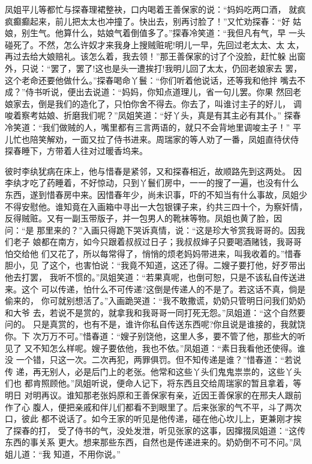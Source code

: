 凤姐平儿等都忙与探春理裙整袂，口内喝着王善保家的说：“妈妈吃两口酒，
就疯疯癫癫起来，前儿把太太也冲撞了。快出去，别再讨脸了！”又忙劝探春：“好
姑娘，别生气。他算什么，姑娘气着倒值多了。”探春冷笑道：“我但凡有气，早
一头碰死了。不然，怎么许奴才来我身上搜贼赃呢!明儿一早，先回过老太太、太
太，再过去给大娘赔礼。该怎么着，我去领！”那王善保家的讨了个没脸，赶忙躲
出窗外，只说：“罢了，罢了!这也是头一遭挨打!我明儿回了太太，仍回老娘家去
罢，这个老命还要他做什么。”探春喝命丫鬟：“你们听着他说话，还等我和他拌
嘴去不成？”侍书听说，便出去说道：“妈妈，你知点道理儿，省一句儿罢。你果
然回老娘家去，倒是我们的造化了，只怕你舍不得去。你去了，叫谁讨主子的好儿，
调唆着察考姑娘、折磨我们呢？”凤姐笑道：“好丫头，真是有其主必有其仆。”
探春冷笑道：“我们做贼的人，嘴里都有三言两语的，就只不会背地里调唆主子！”
平儿忙也陪笑解劝，一面又拉了侍书进来。周瑞家的等人劝了一番，凤姐直待伏侍
探春睡下，方带着人往对过暖香坞来。

彼时李纨犹病在床上，他与惜春是紧邻，又和探春相近，故顺路先到这两处。
因李纨才吃了药睡着，不好惊动，只到丫鬟们房中，一一的搜了一遍，也没有什么
东西，遂到惜春房中来。因惜春年少，尚未识事，吓的不知当有什么事故，凤姐少
不得安慰他。谁知竟在入画箱中寻出一大包银锞子来，约共三四十个，为察奸情，
反得贼赃。又有一副玉带版子，并一包男人的靴袜等物。凤姐也黄了脸，因问：“是
那里来的？”入画只得跪下哭诉真情，说：“这是珍大爷赏我哥哥的。因我们老子
娘都在南方，如今只跟着叔叔过日子；我叔叔婶子只要喝酒赌钱，我哥哥怕交给他
们又花了，所以每常得了，悄悄的烦老妈妈带进来，叫我收着的。”惜春胆小，见
了这个，也害怕说：“我竟不知道，这还了得。二嫂子要打他，好歹带出他去打罢，
我听不惯的。”凤姐笑道：“若果真呢，也倒可恕，只是不该私自传送进来。这个
可以传递，怕什么不可传递?这倒是传递人的不是了。若这话不真，倘是偷来的，
你可就别想活了。”入画跪哭道：“我不敢撒谎，奶奶只管明日问我们奶奶和大爷
去，若说不是赏的，就拿我和我哥哥一同打死无怨。”凤姐道：“这个自然要问的。
只是真赏的，也有不是，谁许你私自传送东西呢?你且说是谁接的，我就饶你。下
次万万不可。”惜春道：“嫂子别饶他，这里人多，要不管了他，那些大的听见了
又不知怎么样呢。嫂子要依他，我也不依。”凤姐道：“素日我看他还使得。谁没
一个错，只这一次。二次再犯，两罪俱罚。但不知传递是谁？”惜春道：“若说传
递，再无别人，必是后门上的老张。他常和这些丫头们鬼鬼祟祟的，这些丫头们也
都肯照顾他。”凤姐听说，便命人记下，将东西且交给周瑞家的暂且拿着，等明日
对明再议。谁知那老张妈原和王善保家有亲，近因王善保家的在邢夫人跟前作了心
腹人，便把亲戚和伴儿们都看不到眼里了。后来张家的气不平，斗了两次口，彼此
都不说话了。如今王家的听见是他传递，碰在他心坎儿上，更兼刚才挨了探春的打，
受了侍书的气，没处发泄，听见张家的这事，因撺掇凤姐道：“这传东西的事关系
更大。想来那些东西，自然也是传递进来的。奶奶倒不可不问。”凤姐儿道：“我
知道，不用你说。”

